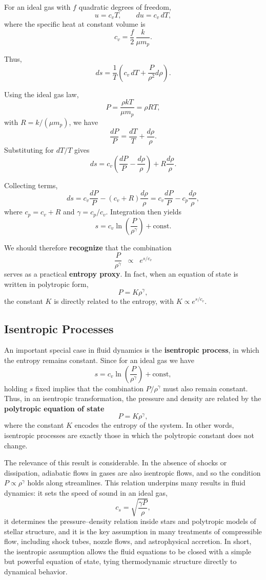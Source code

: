For an ideal gas with $f$ quadratic degrees of freedom,
\[
u = c_v T, \qquad du = c_v\,dT,
\]
where the specific heat at constant volume is
\[
c_v = \frac{f}{2}\,\frac{k}{\mu m_p}.
\]

Thus,
\[
ds = \frac{1}{T}\left(c_v\,dT + \frac{P}{\rho^2} d\rho\right).
\]

Using the ideal gas law,
\[
P = \frac{\rho kT}{\mu m_p} = \rho R T,
\]
with $R = k/(\mu m_p)$, we have
\[
\frac{dP}{P} = \frac{dT}{T} + \frac{d\rho}{\rho}.
\]
Substituting for $dT/T$ gives
\[
ds = c_v\!\left(\frac{dP}{P} - \frac{d\rho}{\rho}\right) + R\frac{d\rho}{\rho}.
\]

Collecting terms,
\[
ds = c_v \frac{dP}{P} - (c_v+R)\frac{d\rho}{\rho} 
    = c_v \frac{dP}{P} - c_p \frac{d\rho}{\rho},
\]
where $c_p = c_v+R$ and $\gamma = c_p/c_v$. Integration then yields
\begin{equation}
\label{eq:specific_entropy}
\boxed{
    s = c_v \ln\!\left(\frac{P}{\rho^\gamma}\right) + \text{const}.
    }
\end{equation}

\begin{bigidea}
We should therefore \textbf{recognize} that the combination
\[
\frac{P}{\rho^\gamma} \;\;\propto\;\; e^{s/c_v}
\]
serves as a practical \textbf{entropy proxy}. In fact, when an equation of state is written in polytropic form,
\[
P = K \rho^\gamma,
\]
the constant $K$ is directly related to the entropy, with $K \propto e^{s/c_v}$.
\end{bigidea}


\subsection{Isentropic Processes}

An important special case in fluid dynamics is the \textbf{isentropic process}, in which the entropy remains constant. Since for an ideal gas we have
\[
s = c_v \ln\!\left(\frac{P}{\rho^\gamma}\right) + \text{const},
\]
holding $s$ fixed implies that the combination $P/\rho^\gamma$ must also remain constant. Thus, in an isentropic transformation, the pressure and density are related by the \textbf{polytropic equation of state}
\[
P = K \rho^\gamma,
\]
where the constant $K$ encodes the entropy of the system. In other words, isentropic processes are exactly those in which the polytropic constant does not change.

The relevance of this result is considerable. In the absence of shocks or dissipation, adiabatic flows in gases are also isentropic flows, and so the condition $P \propto \rho^\gamma$ holds along streamlines. This relation underpins many results in fluid dynamics: it sets the speed of sound in an ideal gas,
\[
c_s = \sqrt{\frac{\gamma P}{\rho}},
\]
it determines the pressure–density relation inside stars and polytropic models of stellar structure, and it is the key assumption in many treatments of compressible flow, including shock tubes, nozzle flows, and astrophysical accretion. In short, the isentropic assumption allows the fluid equations to be closed with a simple but powerful equation of state, tying thermodynamic structure directly to dynamical behavior.

